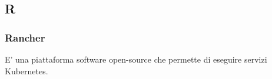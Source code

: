 \subsection*{\textbf{\hfill \Huge{R} \hfill}} 
\subsubsection*{Rancher}
E' una piattaforma software open-source che permette di eseguire servizi Kubernetes\glos.
